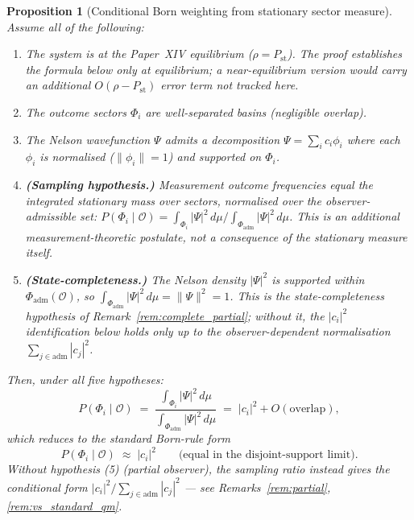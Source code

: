 \documentclass[12pt]{article}
\newtheorem{proposition}[theorem]{Proposition}
\newcommand{\Ocal}{\mathcal{O}}
\newcommand{\Pst}{P_{\mathrm{st}}}
\begin{document}
\begin{proposition}[Conditional Born weighting from stationary sector measure]\label{prop:born}
Assume all of the following:
\begin{enumerate}
    \item The system is at the Paper~XIV equilibrium ($\rho = \Pst$). The proof establishes the formula below only at equilibrium; a near-equilibrium version would carry an additional $O(\rho - \Pst)$ error term not tracked here.
    \item The outcome sectors $\Phi_i$ are well-separated basins (negligible overlap).
    \item The Nelson wavefunction $\Psi$ admits a decomposition $\Psi = \sum_i c_i \phi_i$ where each $\phi_i$ is normalised ($\|\phi_i\| = 1$) and supported on $\Phi_i$.
    \item \textbf{(Sampling hypothesis.)} Measurement outcome frequencies equal the integrated stationary mass over sectors, normalised over the observer-admissible set: $P(\Phi_i \mid \Ocal) = \int_{\Phi_i}|\Psi|^2\,d\mu / \int_{\Phi_\mathrm{adm}}|\Psi|^2\,d\mu$. This is an additional measurement-theoretic postulate, not a consequence of the stationary measure itself.
    \item \textbf{(State-completeness.)} The Nelson density $|\Psi|^2$ is supported within $\Phi_\mathrm{adm}(\Ocal)$, so $\int_{\Phi_\mathrm{adm}}|\Psi|^2 \, d\mu = \|\Psi\|^2 = 1$. This is the state-completeness hypothesis of Remark~\ref{rem:complete_partial}; without it, the $|c_i|^2$ identification below holds only up to the observer-dependent normalisation $\sum_{j \in \mathrm{adm}}|c_j|^2$.
\end{enumerate}
Then, under all five hypotheses:
\begin{equation}\label{eq:born_result}
    P(\Phi_i \mid \Ocal) \;=\; \frac{\int_{\Phi_i} |\Psi|^2\, d\mu}{\int_{\Phi_{\mathrm{adm}}} |\Psi|^2\, d\mu} \;=\; |c_i|^2 + O(\text{overlap}),
\end{equation}
which reduces to the standard Born-rule form
\begin{equation}\label{eq:born_exact}
    P(\Phi_i \mid \Ocal) \;\approx\; |c_i|^2 \qquad \text{(equal in the disjoint-support limit).}
\end{equation}
Without hypothesis (5) (partial observer), the sampling ratio instead gives the conditional form $|c_i|^2 / \sum_{j \in \mathrm{adm}} |c_j|^2$ --- see Remarks~\ref{rem:partial}, \ref{rem:vs_standard_qm}.
\end{proposition}
\end{document}
